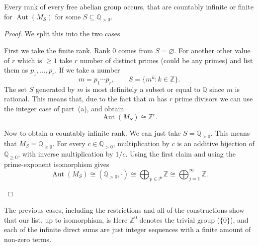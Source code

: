 \documentclass[11pt]{scrartcl}
\begin{document}
\begin{soln}
    \begin{claim*}
        Every rank of every free abelian group occurs, that are
		countably infinite or finite for $\operatorname{Aut}(M_S)$ for some
        $S\subseteq\mathbb Q_{>0}$.
    \end{claim*}

    \begin{proof}
		We split this into the two cases
        \begin{subproof}
			First we take the finite rank. Rank $0$ comes from $S=\varnothing$.
			For another other value of $r$ which is $\ge1$ take $r$ number of distinct 
			primes (could be any primes) and list them as $p_1,\ldots,p_r$. If we 
			take a number
            \[
            m=p_1\cdots p_r,
            \qquad
            S=\{m^k:k\in\mathbb Z\}.
            \]
			The set $S$ generated by $m$ is most definitely a subset or equal to $\mathbb{Q}$
			since $m$ is rational. This means that, due to the fact that $m$ has $r$ prime divisors
			we can use
            the integer case of part~(a), and obtain
            \[
            \operatorname{Aut}(M_S)\cong\mathbb Z^r.
            \]
        \end{subproof}

        \begin{subproof}
			Now to obtain a countably infinite rank. We can just 
            take $S=\mathbb Q_{>0}$. This means that  $M_S=\mathbb Q_{\ge0}$.
			For every $c\in\mathbb Q_{>0}$, multiplication by $c$
            is an additive bijection of $\mathbb Q_{\ge0}$, with
            inverse multiplication by $1/c$.
            Using the first claim and using the prime-exponent isomorphism
            gives
            \[
            \operatorname{Aut}(M_S)
            \cong(\mathbb Q_{>0},\cdot)
            \cong\bigoplus_{p\in\mathcal P}\mathbb Z
            \cong\bigoplus_{j=1}^{\infty}\mathbb Z.
            \]
        \end{subproof}
    \end{proof}

	The previous cases, including the restrictions and all of the constructions
	show that our list, up to isomorphism, is
    Here $\mathbb Z^0$ denotes the trivial group ($\{0\}$), and
	each of the infinite direct sums are just integer sequences
	with a finite amount of non-zero terms.
\end{soln}
\end{document}
